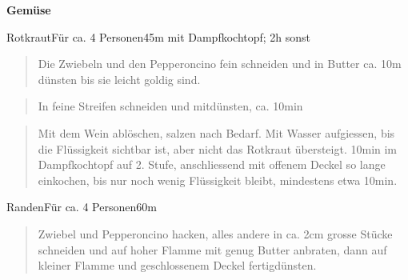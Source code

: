 \documentclass[
  a4paper,
]{article}
\begin{document}
\newpage
\vspace*{\fill}

\textbf{\Huge \sf Gemüse} \vspace*{\fill} \thispagestyle{empty} \newpage

\begin{recipe}{Rotkraut}{Für ca. 4 Personen}{45m mit Dampfkochtopf; 2h sonst}


\begin{quote}
Die Zwiebeln und den Pepperoncino fein schneiden und in Butter ca. 10m
dünsten bis sie leicht goldig sind.
\end{quote}

\freeform\hrulefill


\begin{quote}
In feine Streifen schneiden und mitdünsten, ca. 10min
\end{quote}

\freeform\hrulefill


\begin{quote}
Mit dem Wein ablöschen, salzen nach Bedarf. Mit Wasser aufgiessen, bis
die Flüssigkeit sichtbar ist, aber nicht das Rotkraut übersteigt. 10min
im Dampfkochtopf auf 2. Stufe, anschliessend mit offenem Deckel so lange
einkochen, bis nur noch wenig Flüssigkeit bleibt, mindestens etwa 10min.
\end{quote}

\freeform\hrulefill\newline\freeform{}\end{recipe}

\newpage

\begin{recipe}{Randen}{Für ca. 4 Personen}{60m}


\begin{quote}
Zwiebel und Pepperoncino hacken, alles andere in ca. 2cm grosse Stücke
schneiden und auf hoher Flamme mit genug Butter anbraten, dann auf
kleiner Flamme und geschlossenem Deckel fertigdünsten.
\end{quote}

\freeform\hrulefill\newline\freeform{}\end{recipe}
\end{document}
